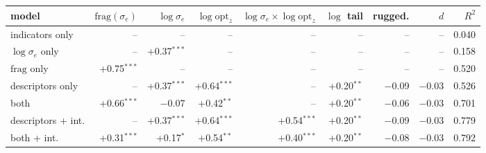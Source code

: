 \begin{tabular}{lrrrrrrrr}
\toprule
model & $\mathrm{frag}(\sigma_e)$ & $\log\sigma_e$ & $\log\mathrm{opt}_z$ & $\log\sigma_e{\times}\log\mathrm{opt}_z$ & $\log$ tail & rugged. & $d$ & $R^2$ \\
\midrule
indicators only & -- & -- & -- & -- & -- & -- & -- & 0.040 \\
$\log\sigma_e$ only & -- & +0.37$^{***}$ & -- & -- & -- & -- & -- & 0.158 \\
$\mathrm{frag}$ only & +0.75$^{***}$ & -- & -- & -- & -- & -- & -- & 0.520 \\
descriptors only & -- & +0.37$^{***}$ & +0.64$^{***}$ & -- & +0.20$^{**}$ & $-$0.09 & $-$0.03 & 0.526 \\
both & +0.66$^{***}$ & $-$0.07 & +0.42$^{**}$ & -- & +0.20$^{**}$ & $-$0.06 & $-$0.03 & 0.701 \\
descriptors + int. & -- & +0.37$^{***}$ & +0.64$^{***}$ & +0.54$^{***}$ & +0.20$^{**}$ & $-$0.09 & $-$0.03 & 0.779 \\
both + int. & +0.31$^{***}$ & +0.17$^{*}$ & +0.54$^{**}$ & +0.40$^{***}$ & +0.20$^{**}$ & $-$0.08 & $-$0.03 & 0.792 \\
\bottomrule
\end{tabular}
